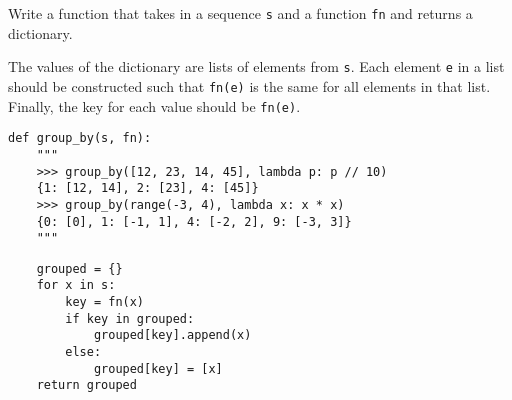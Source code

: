 \question
Write a function that takes in a sequence \texttt{s} and a function
\texttt{fn} and returns a dictionary.

The values of the dictionary are lists of elements from \texttt{s}. Each
element \texttt{e} in a list should be constructed such that \texttt{fn(e)}
is the same for all elements in that list. Finally, the key for each value
should be \texttt{fn(e)}.

\begin{lstlisting}
def group_by(s, fn):
    """
    >>> group_by([12, 23, 14, 45], lambda p: p // 10)
    {1: [12, 14], 2: [23], 4: [45]}
    >>> group_by(range(-3, 4), lambda x: x * x)
    {0: [0], 1: [-1, 1], 4: [-2, 2], 9: [-3, 3]}
    """
\end{lstlisting}
\begin{solution}[1.8in]
\begin{lstlisting}
    grouped = {}
    for x in s:
        key = fn(x)
        if key in grouped:
            grouped[key].append(x)
        else:
            grouped[key] = [x]
    return grouped
\end{lstlisting}
\end{solution}
